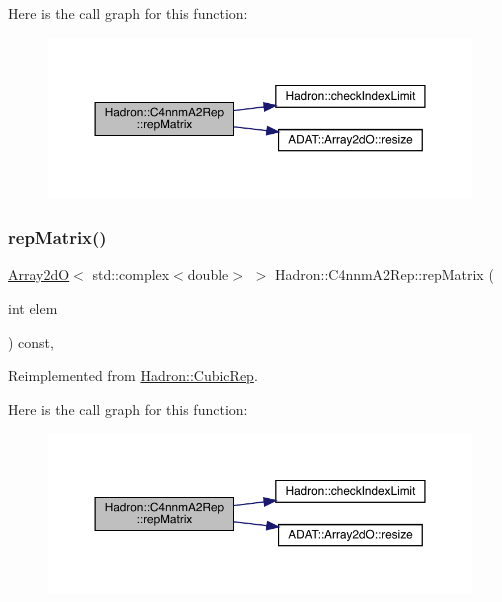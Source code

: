 Here is the call graph for this function\+:
\nopagebreak
\begin{figure}[H]
\begin{center}
\leavevmode
\includegraphics[width=350pt]{d6/d9a/structHadron_1_1C4nnmA2Rep_a7c58333a62449bb9badf449950b1828b_cgraph}
\end{center}
\end{figure}
\mbox{\label{structHadron_1_1C4nnmA2Rep_a7c58333a62449bb9badf449950b1828b}} 
\subsubsection{\texorpdfstring{repMatrix()}{repMatrix()}\hspace{0.1cm}{\footnotesize\ttfamily [2/3]}}
{\footnotesize\ttfamily \mbox{\hyperlink{classADAT_1_1Array2dO}{Array2dO}}$<$ std\+::complex$<$double$>$ $>$ Hadron\+::\+C4nnm\+A2\+Rep\+::rep\+Matrix (\begin{DoxyParamCaption}\item[{int}]{elem }\end{DoxyParamCaption}) const\hspace{0.3cm}{\ttfamily [inline]}, {\ttfamily [virtual]}}



Reimplemented from \mbox{\hyperlink{structHadron_1_1CubicRep_ac5d7e9e6f4ab1158b5fce3e4ad9e8005}{Hadron\+::\+Cubic\+Rep}}.

Here is the call graph for this function\+:
\nopagebreak
\begin{figure}[H]
\begin{center}
\leavevmode
\includegraphics[width=350pt]{d6/d9a/structHadron_1_1C4nnmA2Rep_a7c58333a62449bb9badf449950b1828b_cgraph}
\end{center}
\end{figure}
\mbox{\label{structHadron_1_1C4nnmA2Rep_a7c58333a62449bb9badf449950b1828b}} 
